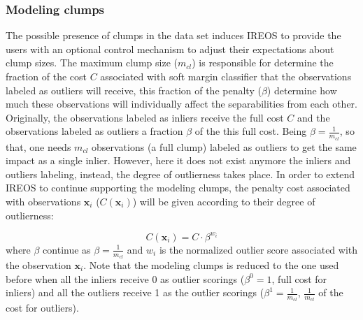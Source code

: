 \subsubsection{Modeling clumps}
The possible presence of clumps in the data set induces IREOS to provide the users with an optional control mechanism to adjust their expectations about clump sizes. The maximum clump size ($m_{cl}$) is responsible for determine the fraction of the cost $C$ associated with soft margin classifier that the observations labeled as outliers will receive, this fraction of the penalty ($\beta$) determine how much these observations will individually affect the separabilities from each other. Originally, the observations labeled as inliers receive the full cost $C$ and the observations labeled as outliers a fraction $\beta$ of the this full cost. Being $\beta = \frac{1}{m_{cl}}$, so that, one needs $m_{cl}$ observations (a full clump) labeled as outliers to get the same impact as a single inlier. However, here it does not exist anymore the inliers and outliers labeling, instead, the degree of outlierness takes place. In order to extend IREOS to continue supporting the modeling clumps, the penalty cost associated with observations $\mathbf{x}_i$ ($C(\mathbf{x}_i)$) will be given according to their degree of outlierness:

\begin{equation}
C(\mathbf{x}_i) = C \cdot \beta^{w_i}
\end{equation}
where $\beta$ continue as $\beta = \frac{1}{m_{cl}}$ and ${w_i}$ is the normalized outlier score associated with the observation $\mathbf{x}_i$. Note that the modeling clumps is reduced to the one used before when all the inliers receive 0 as outlier scorings ($\beta^0 = 1$, full cost for inliers) and all the outliers receive 1 as the outlier scorings ($\beta^1 = \frac{1}{m_{cl}}$, $\frac{1}{m_{cl}}$ of the cost for outliers).


\newpage